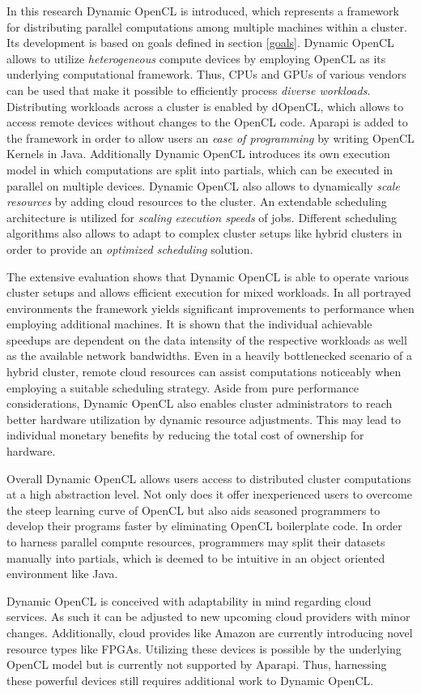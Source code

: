 In this research Dynamic OpenCL is introduced, which represents a framework for distributing parallel computations among multiple machines within a cluster. Its development is based on goals defined in section \ref{goals}. Dynamic OpenCL allows to utilize \textit{heterogeneous} compute devices by employing OpenCL as its underlying computational framework. Thus, CPUs and GPUs of various vendors can be used that make it possible to efficiently process \textit{diverse workloads}. Distributing workloads across a cluster is enabled by dOpenCL, which allows to access remote devices without changes to the OpenCL code. Aparapi is added to the framework in order to allow users an \textit{ease of programming} by writing OpenCL Kernels in Java. Additionally Dynamic OpenCL introduces its own execution model in which computations are split into partials, which can be executed in parallel on multiple devices. Dynamic OpenCL also allows to dynamically \textit{scale resources} by adding cloud resources to the cluster. An extendable scheduling architecture is utilized for \textit{scaling execution speeds} of jobs. Different scheduling algorithms also allows to adapt to complex cluster setups like hybrid clusters in order to provide an \textit{optimized scheduling} solution.

The extensive evaluation shows that Dynamic OpenCL is able to operate various cluster setups and allows efficient execution for mixed workloads. In all portrayed environments the framework yields significant improvements to performance when employing additional machines. It is shown that the individual achievable speedups are dependent on the data intensity of the respective workloads as well as the available network bandwidths. Even in a heavily bottlenecked scenario of a hybrid cluster, remote cloud resources can assist computations noticeably when employing a suitable scheduling strategy. Aside from pure performance considerations, Dynamic OpenCL also enables cluster administrators to reach better hardware utilization by dynamic resource adjustments. This may lead to individual monetary benefits by reducing the total cost of ownership for hardware.

Overall Dynamic OpenCL allows users access to distributed cluster computations at a high abstraction level. Not only does it offer inexperienced users to overcome the steep learning curve of OpenCL but also aids seasoned programmers to develop their programs faster by eliminating OpenCL boilerplate code. In order to harness parallel compute resources, programmers may split their datasets manually into partials, which is deemed to be intuitive in an object oriented environment like Java. 

Dynamic OpenCL is conceived with adaptability in mind regarding cloud services. As such it can be adjusted to new upcoming cloud providers with minor changes. Additionally, cloud provides like Amazon are currently introducing novel resource types like FPGAs\cite{amazon_fpga}. Utilizing these devices is possible by the underlying OpenCL model but is currently not supported by Aparapi. Thus, harnessing these powerful devices still requires additional work to Dynamic OpenCL.
